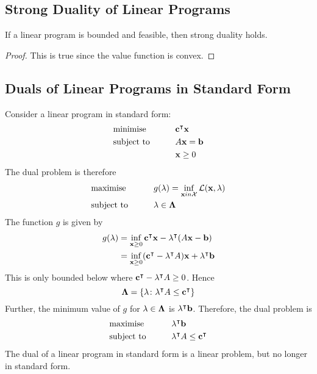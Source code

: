 \subsection{Strong Duality of Linear Programs}
\begin{theorem}
    If a linear program is bounded and feasible, then strong duality holds.
\end{theorem}
\begin{proof}
    This is true since the value function is convex.
\end{proof}

\subsection{Duals of Linear Programs in Standard Form}
Consider a linear program in standard form:
\begin{alignat*}{2}
    & \text{minimise} & \qquad & \vb c^\intercal \vb x     \\
    & \text{subject to}                             &        & A \vb x = \vb b   \\
    &                                               &        & \vb x \geq 0
\end{alignat*}
The dual problem is therefore
\begin{alignat*}{2}
    & \text{maximise} & \qquad & g(\vb \lambda) = \inf_{\vb x in \mathcal X} \mathcal L(\vb x, \vb \lambda)     \\
    & \text{subject to}                             &        & \vb \lambda \in \vb \Lambda   \\
\end{alignat*}
The function \( g \) is given by
\begin{align*}
    g(\vb \lambda) &= \inf_{\vb x \geq 0} \vb c^\intercal \vb x - \vb \lambda^\intercal (A \vb x - \vb b) \\
    &= \inf_{\vb x \geq 0} (\vb c^\intercal - \vb \lambda^\intercal A)\vb x + \vb \lambda^\intercal \vb b
\end{align*}
This is only bounded below where \( \vb c^\intercal - \vb \lambda^\intercal A \geq 0 \). Hence
\[ \vb \Lambda = \qty{\vb \lambda \colon \vb \lambda^\intercal A \leq \vb c^\intercal} \]
Further, the minimum value of \( g \) for \( \vb \lambda \in \vb \Lambda \) is \( \vb \lambda^\intercal \vb b \).
Therefore, the dual problem is
\begin{alignat*}{2}
    & \text{maximise} & \qquad & \vb \lambda^\intercal \vb b     \\
    & \text{subject to}                             &        & \vb \lambda^\intercal A \leq \vb c^\intercal \\
\end{alignat*}
The dual of a linear program in standard form is a linear problem, but no longer in standard form.

